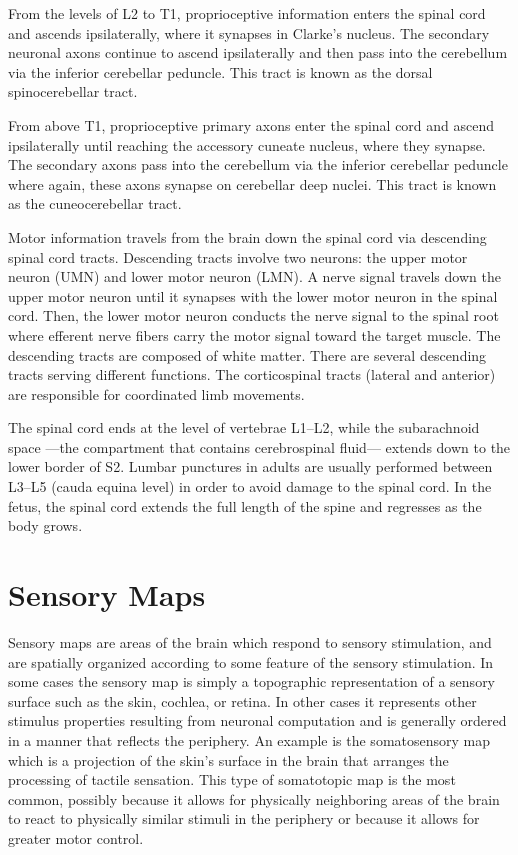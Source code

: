 From the levels of L2 to T1, proprioceptive information enters the spinal cord and ascends ipsilaterally, where it synapses in Clarke's nucleus. The secondary neuronal axons continue to ascend ipsilaterally and then pass into the cerebellum via the inferior cerebellar peduncle. This tract is known as the dorsal spinocerebellar tract.

From above T1, proprioceptive primary axons enter the spinal cord and ascend ipsilaterally until reaching the accessory cuneate nucleus, where they synapse. The secondary axons pass into the cerebellum via the inferior cerebellar peduncle where again, these axons synapse on cerebellar deep nuclei. This tract is known as the cuneocerebellar tract.

Motor information travels from the brain down the spinal cord via descending spinal cord tracts. Descending tracts involve two neurons: the upper motor neuron (UMN) and lower motor neuron (LMN). A nerve signal travels down the upper motor neuron until it synapses with the lower motor neuron in the spinal cord. Then, the lower motor neuron conducts the nerve signal to the spinal root where efferent nerve fibers carry the motor signal toward the target muscle. The descending tracts are composed of white matter. There are several descending tracts serving different functions. The corticospinal tracts (lateral and anterior) are responsible for coordinated limb movements.

The spinal cord ends at the level of vertebrae L1--L2, while the subarachnoid space ---the compartment that contains cerebrospinal fluid--- extends down to the lower border of S2. Lumbar punctures in adults are usually performed between L3--L5 (cauda equina level) in order to avoid damage to the spinal cord. In the fetus, the spinal cord extends the full length of the spine and regresses as the body grows.

\hypertarget{sensory-maps}{%
\section{Sensory Maps}\label{sensory-maps}}

Sensory maps are areas of the brain which respond to sensory stimulation, and are spatially organized according to some feature of the sensory stimulation. In some cases the sensory map is simply a topographic representation of a sensory surface such as the skin, cochlea, or retina. In other cases it represents other stimulus properties resulting from neuronal computation and is generally ordered in a manner that reflects the periphery. An example is the somatosensory map which is a projection of the skin's surface in the brain that arranges the processing of tactile sensation. This type of somatotopic map is the most common, possibly because it allows for physically neighboring areas of the brain to react to physically similar stimuli in the periphery or because it allows for greater motor control.

